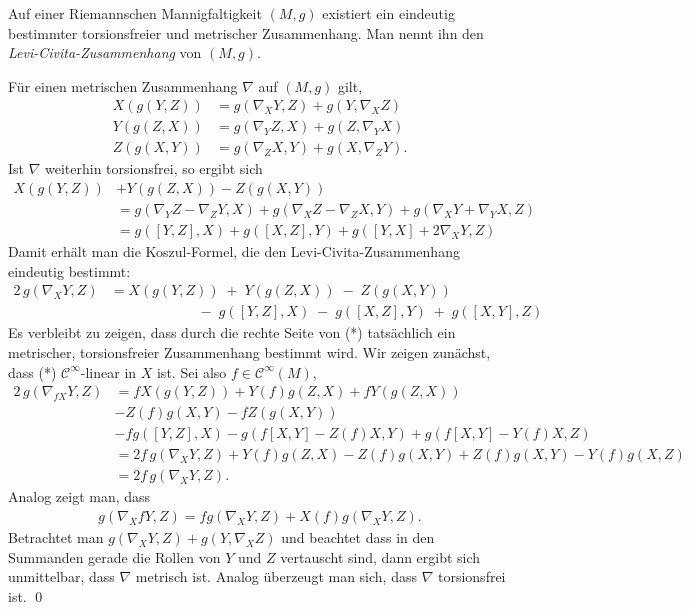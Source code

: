 \documentclass[%
	paper=a5,%
	fleqn,%
	DIV=18,%
	BCOR=0mm,
	fontsize=11pt,
	titlepage=false,%
	bibliography=totoc,
	DIV=18,%
	twoside=true,
	pdftitle=Riemannsche Geometrie,
	pdfauthor=Uwe Semmelmann,
	numbers=noendperiod]%
	{scrbook}
\begin{document}
\begin{Satz}
Auf einer Riemannschen Mannigfaltigkeit $(M, g)$ existiert ein eindeutig bestimmter torsionsfreier und
metrischer Zusammenhang.  Man nennt ihn den \emph{ Levi-Civita-Zusammenhang } von $(M,g)$.\fish
\end{Satz}
\proof
F\"ur einen metrischen Zusammenhang $\nabla$ auf $(M,g)$ gilt,
\begin{align*}
X(g(Y,Z)) &= g(\nabla_X Y,Z) + g(Y,\nabla_X Z)\\
Y(g(Z,X)) &= g(\nabla_Y Z,X) + g(Z,\nabla_Y X)\\
Z(g(X,Y)) &= g(\nabla_Z X,Y) + g(X,\nabla_Z Y).
\end{align*} 
Ist $\nabla$ weiterhin torsionsfrei, so ergibt sich
\begin{align*}
X(g(Y,Z)) &+ Y(g(Z,X)) - Z(g(X,Y)) \\ &= g(\nabla_Y Z - \nabla_Z Y, X)
+ g(\nabla_X  Z - \nabla_Z X  ,Y) + g(\nabla_X Y +\nabla_Y X,Z)\\
&= g([Y,Z],X) + g([X,Z],Y) + g([Y,X] + 2\nabla_X Y,Z)
\end{align*}
Damit erh\"alt man die Koszul-Formel, die den Levi-Civita-Zusammenhang eindeutig bestimmt:
\begin{align*}
2\,g(\nabla_XY, Z)
& = X(g(Y, Z)) \;+\; Y(g(Z,X)) \;-\; Z(g(X,Y)) \\[1ex]
& \phantom{xx.xxxxxxxx} \;-\; g([Y,Z],X) \;-\; g([X,Z],Y) \;+\;
g([X,Y],Z)\tag{*}
\end{align*}
Es verbleibt zu zeigen, dass durch die rechte Seite von (*) tats\"achlich ein
metrischer, torsionsfreier Zusammenhang bestimmt wird. Wir zeigen zun\"achst, dass
(*) $\mathcal C^\infty$-linear in $X$ ist. Sei also $f\in\mathcal C^\infty(M)$,
\begin{align*}
2\,g(\nabla_{fX}Y, Z) &= f X(g(Y,Z)) + Y(f)g(Z,X) + f Y(g(Z,X)) \\ &- Z(f)g(X,Y)
- fZ(g(X,Y))\\
&- fg([Y,Z],X) - g(f[X,Y] - Z(f)X,Y) + 
g(f[X,Y] - Y(f)X,Z)\\
&= 2f\,g(\nabla_X Y,Z) + Y(f)g(Z,X) - Z(f)g(X,Y) + Z(f)g(X,Y) - Y(f)g(X,Z)\\
&=2f\,g(\nabla_X Y,Z).
\end{align*}
Analog zeigt man, dass
\begin{align*}
g(\nabla_X fY,Z) = fg(\nabla_X Y,Z) + X(f)g(\nabla_X Y,Z).
\end{align*}
Betrachtet man $g(\nabla_X Y,Z)+g(Y,\nabla_X Z)$ und beachtet dass in den
Summanden gerade die Rollen von $Y$ und $Z$ vertauscht sind, dann ergibt sich
unmittelbar, dass $\nabla$ metrisch ist. Analog \"uberzeugt man sich, dass
$\nabla$ torsionsfrei ist.
\qed
\end{document}
